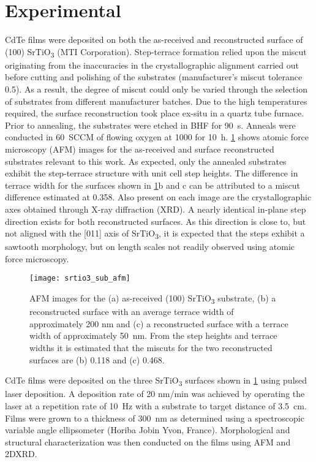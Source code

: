 \section{Experimental}
CdTe films were deposited on both the as-received and reconstructed surface of (100) SrTiO\textsubscript{3} (MTI Corporation).
Step-terrace formation relied upon the miscut originating from the inaccuracies in the crystallographic alignment carried out before cutting and polishing of the substrates (manufacturer's miscut tolerance 0.5\degree{}).
As a result, the degree of miscut could only be varied through the selection of substrates from different manufacturer batches.
Due to the high temperatures required, the surface reconstruction took place ex-situ in a quartz tube furnace.
Prior to annealing, the substrates were etched in BHF for 90~s.
Anneals were conducted in 60~SCCM of flowing oxygen at 1000\celsius{} for 10~h.
\cref{fig:srtio3_sub_afm} shows atomic force microscopy (AFM) images for the as-received and surface reconstructed substrates relevant to this work.
As expected, only the annealed substrates exhibit the step-terrace structure with unit cell step heights.
The difference in terrace width for the surfaces shown in \cref{fig:srtio3_sub_afm}b and c can be attributed to a miscut difference estimated at 0.358\degree{}.
Also present on each image are the crystallographic axes obtained through X-ray diffraction (XRD).
A nearly identical in-plane step direction exists for both reconstructed surfaces.
As this direction is close to, but not aligned with the [011] axis of SrTiO\textsubscript{3}, it is expected that the steps exhibit a sawtooth morphology, but on length scales not readily observed using atomic force microscopy.
\begin{figure}
 \centering \texttt{[image: srtio3\_sub\_afm]}
 \caption[AFM of SrTiO\textsubscript{3} surfaces]{\label{fig:srtio3_sub_afm}AFM images for the (a) as-received (100) SrTiO\textsubscript{3} substrate, (b) a reconstructed surface with an average terrace width of approximately 200 nm and (c) a reconstructed surface with a terrace width of approximately 50~nm.
  From the step heights and terrace widths it is estimated that the miscuts for the two reconstructed surfaces are (b) 0.118\degree{} and (c) 0.468\degree{}.}
\end{figure}

CdTe films were deposited on the three SrTiO\textsubscript{3} surfaces shown in \cref{fig:srtio3_sub_afm} using pulsed laser deposition.
A deposition rate of 20 nm/min was achieved by operating the laser at a repetition rate of 10~Hz with a substrate to target distance of 3.5~cm.
Films were grown to a thickness of 300~nm as determined using a spectroscopic variable angle ellipsometer (Horiba Jobin Yvon, France).
Morphological and structural characterization was then conducted on the films using AFM and 2DXRD\@.
